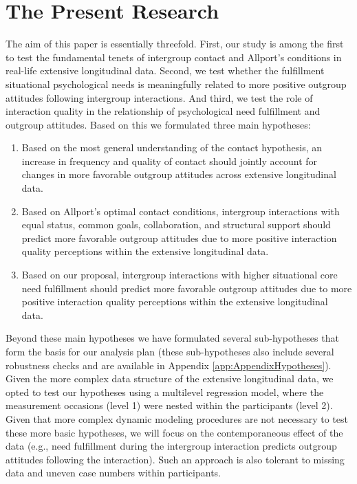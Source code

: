 \documentclass[man, 12pt, a4paper, mask]{apa7}
\theoremstyle{break}
\theoremstyle{plain}
\begin{document}
\section{The Present Research}
The aim of this paper is essentially threefold. First, our study is among the first to test the fundamental tenets of intergroup contact and Allport's conditions in real-life extensive longitudinal data. Second, we test whether the fulfillment situational psychological needs is meaningfully related to more positive outgroup attitudes following intergroup interactions. And third, we test the role of interaction quality in  the relationship of psychological need fulfillment and outgroup attitudes. Based on this we formulated three main hypotheses:
\begin{enumerate}[label=H\arabic*:]
    \item Based on the most general understanding of the contact hypothesis, an increase in frequency and quality of contact should jointly account for changes in more favorable outgroup attitudes across extensive longitudinal data.
    \item Based on Allport’s optimal contact conditions, intergroup interactions with equal status, common goals, collaboration, and structural support should predict more favorable outgroup attitudes due to more positive interaction quality perceptions within the extensive longitudinal data.
    \item Based on our proposal, intergroup interactions with higher situational core need fulfillment should predict more favorable outgroup attitudes due to more positive interaction quality perceptions within the extensive longitudinal data.
\end{enumerate}
Beyond these main hypotheses we have formulated several sub-hypotheses that form the basis for our analysis plan (these sub-hypotheses also include several robustness checks and are available in Appendix \ref{app:AppendixHypotheses}). Given the more complex data structure of the extensive longitudinal data, we opted to test our hypotheses using a multilevel regression model, where the measurement occasions (level 1) were nested within the participants (level 2). Given that more complex dynamic modeling procedures are not necessary to test these more basic hypotheses, we will focus on the contemporaneous effect of the data (e.g., need fulfillment during the intergroup interaction predicts outgroup attitudes following the interaction). Such an approach is also tolerant to missing data and uneven case numbers within participants.
\end{document}
